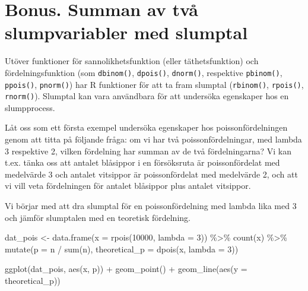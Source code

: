 \documentclass[
]{book}
\newenvironment{Shaded}{\begin{snugshade}}{\end{snugshade}}
\newcommand{\AttributeTok}[1]{\textcolor[rgb]{0.77,0.63,0.00}{#1}}
\newcommand{\DecValTok}[1]{\textcolor[rgb]{0.00,0.00,0.81}{#1}}
\newcommand{\FunctionTok}[1]{\textcolor[rgb]{0.00,0.00,0.00}{#1}}
\newcommand{\NormalTok}[1]{#1}
\newcommand{\OtherTok}[1]{\textcolor[rgb]{0.56,0.35,0.01}{#1}}
\newcommand{\SpecialCharTok}[1]{\textcolor[rgb]{0.00,0.00,0.00}{#1}}
\theoremstyle{definition}
\theoremstyle{definition}
\theoremstyle{definition}
\theoremstyle{definition}
\theoremstyle{remark}
\begin{document}
\hypertarget{bonus.-summan-av-tvuxe5-slumpvariabler-med-slumptal}{%
\section{Bonus. Summan av två slumpvariabler med slumptal}\label{bonus.-summan-av-tvuxe5-slumpvariabler-med-slumptal}}

Utöver funktioner för sannolikhetsfunktion (eller täthetsfunktion) och fördelningsfunktion (som \texttt{dbinom()}, \texttt{dpois()}, \texttt{dnorm()}, respektive \texttt{pbinom()}, \texttt{ppois()}, \texttt{pnorm()}) har R funktioner för att ta fram slumptal (\texttt{rbinom()}, \texttt{rpois()}, \texttt{rnorm()}). Slumptal kan vara användbara för att undersöka egenskaper hos en slumpprocess.

Låt oss som ett första exempel undersöka egenskaper hos poissonfördelningen genom att titta på följande fråga: om vi har två poissonfördelningar, med lambda 3 respektive 2, vilken fördelning har summan av de två fördelningarna? Vi kan t.ex. tänka oss att antalet blåsippor i en försöksruta är poissonfördelat med medelvärde 3 och antalet vitsippor är poissonfördelat med medelvärde 2, och att vi vill veta fördelningen för antalet blåsippor plus antalet vitsippor.

Vi börjar med att dra slumptal för en poissonfördelning med lambda lika med 3 och jämför slumptalen med en teoretisk fördelning.

\begin{Shaded}
\begin{Highlighting}[]
\NormalTok{dat\_pois }\OtherTok{\textless{}{-}} \FunctionTok{data.frame}\NormalTok{(}\AttributeTok{x =} \FunctionTok{rpois}\NormalTok{(}\DecValTok{10000}\NormalTok{, }\AttributeTok{lambda =} \DecValTok{3}\NormalTok{)) }\SpecialCharTok{\%\textgreater{}\%} 
  \FunctionTok{count}\NormalTok{(x) }\SpecialCharTok{\%\textgreater{}\%} 
  \FunctionTok{mutate}\NormalTok{(}\AttributeTok{p =}\NormalTok{ n }\SpecialCharTok{/} \FunctionTok{sum}\NormalTok{(n),}
         \AttributeTok{theoretical\_p =} \FunctionTok{dpois}\NormalTok{(x, }\AttributeTok{lambda =} \DecValTok{3}\NormalTok{))}

\FunctionTok{ggplot}\NormalTok{(dat\_pois, }\FunctionTok{aes}\NormalTok{(x, p)) }\SpecialCharTok{+}
  \FunctionTok{geom\_point}\NormalTok{() }\SpecialCharTok{+}
  \FunctionTok{geom\_line}\NormalTok{(}\FunctionTok{aes}\NormalTok{(}\AttributeTok{y =}\NormalTok{ theoretical\_p))}
\end{Highlighting}
\end{Shaded}
\end{document}
